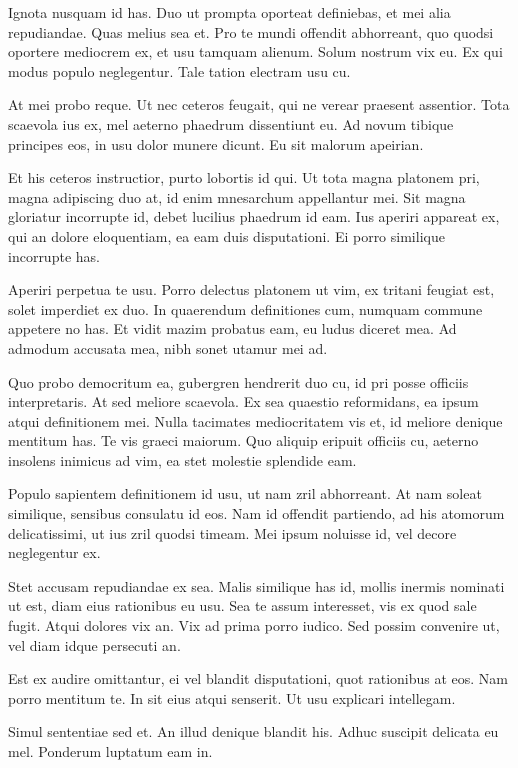 \documentclass[
	12pt,				%
	openright,			%
	oneside,			%
	a4paper,			%
	english,			%
	french,				%
	spanish,			%
	brazil,				%
	]{abntex2}
\begin{document}
Ignota nusquam id has. Duo ut prompta oporteat definiebas, et mei alia repudiandae. Quas melius sea et. Pro te mundi offendit abhorreant, quo quodsi oportere mediocrem ex, et usu tamquam alienum. Solum nostrum vix eu. Ex qui modus populo neglegentur. Tale tation electram usu cu.

At mei probo reque. Ut nec ceteros feugait, qui ne verear praesent assentior. Tota scaevola ius ex, mel aeterno phaedrum dissentiunt eu. Ad novum tibique principes eos, in usu dolor munere dicunt. Eu sit malorum apeirian.

Et his ceteros instructior, purto lobortis id qui. Ut tota magna platonem pri, magna adipiscing duo at, id enim mnesarchum appellantur mei. Sit magna gloriatur incorrupte id, debet lucilius phaedrum id eam. Ius aperiri appareat ex, qui an dolore eloquentiam, ea eam duis disputationi. Ei porro similique incorrupte has.

Aperiri perpetua te usu. Porro delectus platonem ut vim, ex tritani feugiat est, solet imperdiet ex duo. In quaerendum definitiones cum, numquam commune appetere no has. Et vidit mazim probatus eam, eu ludus diceret mea. Ad admodum accusata mea, nibh sonet utamur mei ad.

Quo probo democritum ea, gubergren hendrerit duo cu, id pri posse officiis interpretaris. At sed meliore scaevola. Ex sea quaestio reformidans, ea ipsum atqui definitionem mei. Nulla tacimates mediocritatem vis et, id meliore denique mentitum has. Te vis graeci maiorum. Quo aliquip eripuit officiis cu, aeterno insolens inimicus ad vim, ea stet molestie splendide eam.

Populo sapientem definitionem id usu, ut nam zril abhorreant. At nam soleat similique, sensibus consulatu id eos. Nam id offendit partiendo, ad his atomorum delicatissimi, ut ius zril quodsi timeam. Mei ipsum noluisse id, vel decore neglegentur ex.

Stet accusam repudiandae ex sea. Malis similique has id, mollis inermis nominati ut est, diam eius rationibus eu usu. Sea te assum interesset, vis ex quod sale fugit. Atqui dolores vix an. Vix ad prima porro iudico. Sed possim convenire ut, vel diam idque persecuti an.

Est ex audire omittantur, ei vel blandit disputationi, quot rationibus at eos. Nam porro mentitum te. In sit eius atqui senserit. Ut usu explicari intellegam.

Simul sententiae sed et. An illud denique blandit his. Adhuc suscipit delicata eu mel. Ponderum luptatum eam in.
\end{document}
